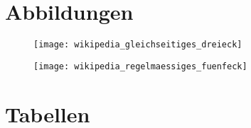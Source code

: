 %
%
%
\begin{appendices}


%
%
%
\chapter{Abbildungen}


\begin{figure}[h]
	\centering
	\texttt{[image: wikipedia\_gleichseitiges\_dreieck]}
	\label{fig:wikipedia_gleichseitiges_dreieck}
\end{figure}



\begin{figure}[h]
	\centering
	\texttt{[image: wikipedia\_regelmaessiges\_fuenfeck]}
	\label{fig:wikipedia_regelmaessiges_fuenfeck}
\end{figure}


%
%
%
\chapter{Tabellen}


\end{appendices}
